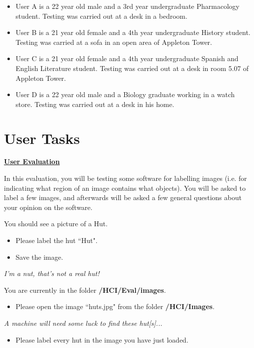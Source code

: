 \documentclass[11pt,twocolumn]{article}
\begin{document}
\begin{itemize}
\item User A is a 22 year old male and a 3rd year undergraduate Pharmacology student. Testing was carried out at a desk in a bedroom.
\item User B is a 21 year old female and a 4th year undergraduate History student. Testing was carried at a sofa in an open area of Appleton Tower.
\item User C is a 21 year old female and a 4th year undergraduate Spanish and English Literature student. Testing was carried out at a desk in room 5.07 of Appleton Tower.
\item User D is a 22 year old male and a Biology graduate working in a watch store. Testing was carried out at a desk in his home. 
\end{itemize}

\newpage
\section{User Tasks}
\underline{\bf User Evaluation} \newline

\noindent In this evaluation, you will be testing some software for labelling images (i.e. for indicating what region of an image contains what objects). You will be asked to label a few images, and afterwards will be asked a few general questions about your opinion on the software. \newline 


You should see a picture of a Hut. 
\begin{itemize}
\item Please label the hut ``Hut".
\item Save the image.
\end{itemize}

\indent \indent \indent \indent \indent \indent  \indent \indent \indent  \indent \indent \indent \indent \indent \indent 
\indent  \indent \indent \indent \indent  \indent \indent \indent 
\emph{I’m a nut, that’s not a real hut!}

You are currently in the folder {\bf /HCI/Eval/images}.
\begin{itemize}
\item Please open the image ``huts.jpg" from the folder {\bf /HCI/Images}.
\end{itemize}

\indent \indent \indent \indent \indent \indent 
\indent  \indent \indent \indent \indent  \indent \indent \indent  \emph{A machine will need some luck to find these hut[s]...}
\begin{itemize}
\item Please label every hut in the image you have just loaded.
\end{itemize}
\end{document}
